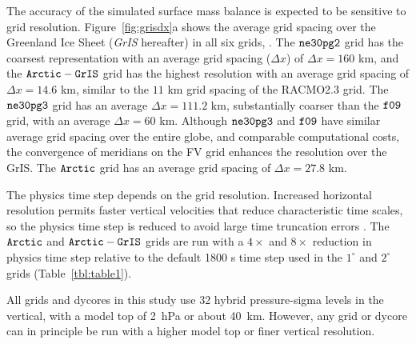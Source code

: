 \documentclass[draft]{agujournal2019}
\begin{document}
The accuracy of the simulated surface mass balance is expected to be sensitive to grid resolution. Figure~\ref{fig:grisdx}a shows the average grid spacing over the Greenland Ice Sheet (\textit{GrIS} hereafter) in all six grids, {}. The $\tt ne30pg2$ grid has the coarsest representation with an average grid spacing ($\Delta x$) of $\Delta x=160$ km, and the $\tt Arctic-GrIS$ grid has the highest resolution with an average grid spacing of $\Delta x=14.6$ km, similar to the $11$ km grid spacing of the RACMO2.3 grid. The $\tt ne30pg3$ grid has an average $\Delta x=111.2$ km, substantially coarser than the $\tt f09$ grid, with an average $\Delta x=60$ km. Although $\tt ne30pg3$ and $\tt f09$ have similar average grid spacing over the entire globe, and comparable computational costs, the convergence of meridians on the FV grid enhances the resolution over the GrIS. The $\tt Arctic$ grid has an average grid spacing of $\Delta x=27.8$ km.

The physics time step depends on the grid resolution. Increased horizontal resolution permits faster vertical velocities that reduce characteristic time scales, so the physics time step is reduced to avoid large time truncation errors \cite{HR2018JAMES}. The $\tt Arctic$ and $\tt Arctic-GrIS$ grids are run with a $4\times$ and $8\times$ reduction in physics time step relative to the default 1800 s time step used in the $1^{\circ}$ and $2^{\circ}$ grids (Table~\ref{tbl:table1}).

All grids and dycores in this study use 32 hybrid pressure-sigma levels in the vertical, with a model top of 2~hPa or about 40~km. However, any grid or dycore can in principle be run with a higher model top or finer vertical resolution.

\subsection{{\color{blue}{Computational costs}}}
\end{document}
